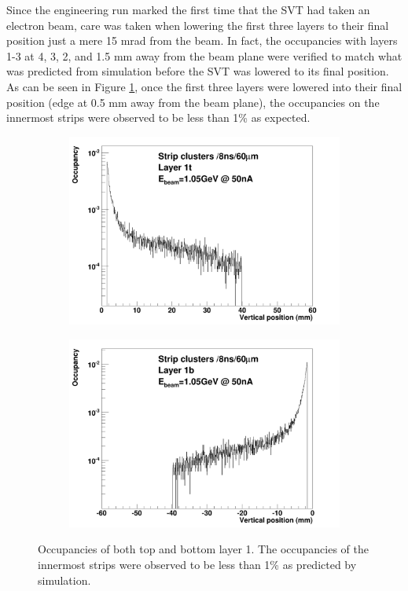 Since the engineering run marked the first time that the SVT had taken an 
electron beam, care was taken when lowering the first three layers to their 
final position just a mere 15 mrad from the beam.  In fact, the occupancies 
with layers 1-3 at 4, 3, 2, and 1.5 mm away from the beam plane were verified to
match what was predicted from simulation before the SVT was lowered to its final
position.  As can be seen in Figure \ref{fig:occupancies}, once the first
three layers were lowered into their final position (edge at 0.5 mm away from the
beam plane), the occupancies on the innermost strips were observed to be less
than 1\% as expected.
\begin{figure}[h!b]
    \begin{subfigure}{.5\textwidth}
        \centering
        \includegraphics[width=\textwidth]{images/cluster_occupancy_L1t_axial.png}
    \end{subfigure}
    \begin{subfigure}{.5\textwidth}
        \centering
        \includegraphics[width=\textwidth]{images/cluster_occupancy_L1b_axial.png}
    \end{subfigure}
    \caption{Occupancies of both top and bottom layer 1.  The occupancies of 
             the innermost strips were observed to be less than 1\% as predicted
             by simulation.}
    \label{fig:occupancies}
\end{figure}  

